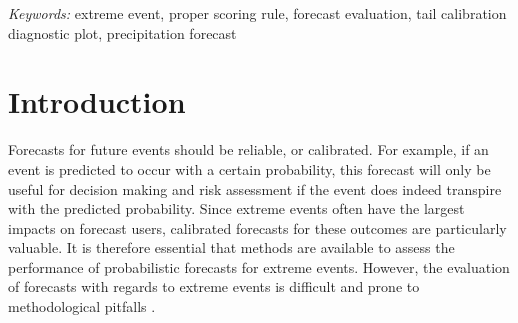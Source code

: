 \documentclass[12pt]{article}
\newcommand{\1}{\mathbf{1}} %
\theoremstyle{definition}
\begin{document}
\bigskip
\begin{abstract}
Probabilistic forecasts comprehensively describe the uncertainty in the unknown future outcome, making them essential for decision making and risk management. While several methods have been introduced to evaluate probabilistic forecasts, existing evaluation techniques are ill-suited to the evaluation of tail properties of such forecasts. However, these tail properties are often of particular interest to forecast users due to the severe impacts caused by extreme outcomes. In this work, we introduce a general notion of tail calibration for probabilistic forecasts, which allows forecasters to assess the reliability of their predictions for extreme outcomes. We study the relationships between tail calibration and standard notions of forecast calibration, and discuss connections to peaks-over-threshold models in extreme value theory. Diagnostic tools are introduced and applied in a case study on European precipitation forecasts.
\end{abstract}

\noindent%
{\it Keywords:}  extreme event, proper scoring rule, forecast evaluation, tail calibration diagnostic plot, precipitation forecast
\vfill

\newpage



\section{Introduction}\label{sec:intro}

Forecasts for future events should be reliable, or calibrated. For example, if an event is predicted to occur with a certain probability, this forecast will only be useful for decision making and risk assessment if the event does indeed transpire with the predicted probability. Since extreme events often have the largest impacts on forecast users, calibrated forecasts for these outcomes are particularly valuable. It is therefore essential that methods are available to assess the performance of probabilistic forecasts for extreme events. However, the evaluation of forecasts with regards to extreme events is difficult and prone to methodological pitfalls \citep{LerchEtAl2017,BellierEtAl2017}.
\end{document}
